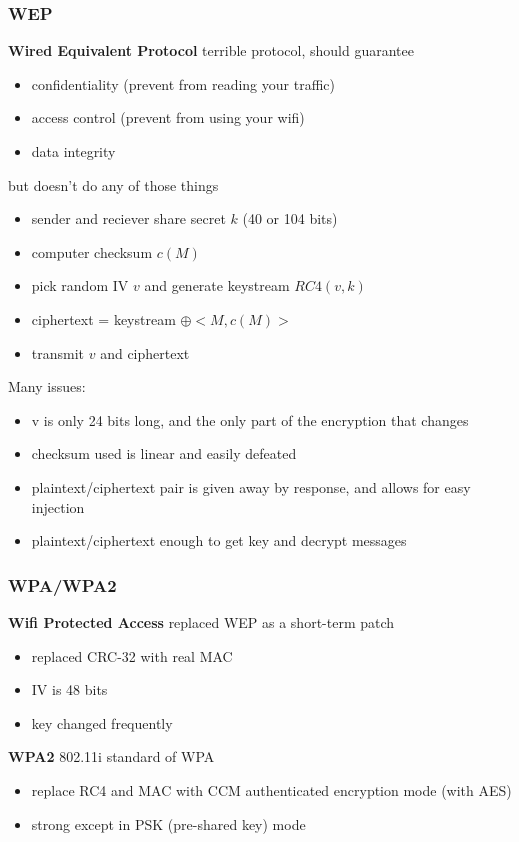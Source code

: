 \documentclass[]{article}
\theoremstyle{definition}
\begin{document}
	\subsubsection{WEP}
	\textbf{Wired Equivalent Protocol} terrible protocol, should guarantee
	\begin{itemize}
		\item confidentiality (prevent from reading your traffic)
		\item access control (prevent from using your wifi)
		\item data integrity
	\end{itemize}
	but doesn't do any of those things
	\begin{itemize}
		\item sender and reciever share secret $k$ (40 or 104 bits)
		\item computer checksum $c(M)$
		\item pick random IV $v$ and generate keystream $RC4(v, k)$
		\item ciphertext = keystream $\oplus <M,c(M)>$
		\item transmit $v$ and ciphertext
	\end{itemize}
	Many issues:
	\begin{itemize}
		\item v is only 24 bits long, and the only part of the encryption that changes
		\item checksum used is linear and easily defeated
		\item plaintext/ciphertext pair is given away by response, and allows for easy injection
		\item plaintext/ciphertext enough to get key and decrypt messages
	\end{itemize}

	\subsubsection{WPA/WPA2}
	\textbf{Wifi Protected Access} replaced WEP as a short-term patch
	\begin{itemize}
		\item replaced CRC-32 with real MAC
		\item IV is 48 bits 
		\item key changed frequently
	\end{itemize}
	\textbf{WPA2} 802.11i standard of WPA
	\begin{itemize}
		\item replace RC4 and MAC with CCM authenticated encryption mode (with AES)
		\item strong except in PSK (pre-shared key) mode
	\end{itemize}
\end{document}
